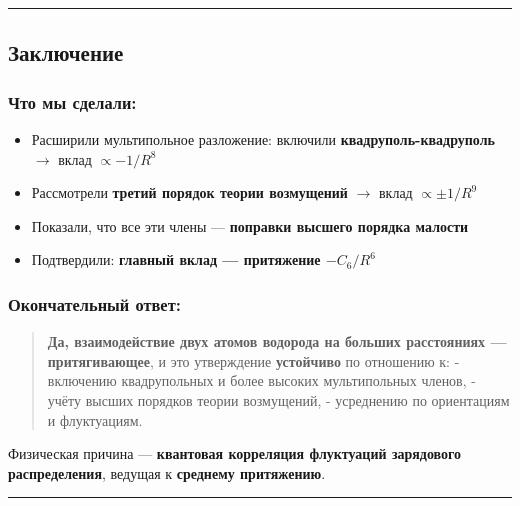 \documentclass[11pt]{article}
\providecommand{\tightlist}{%
      \setlength{\itemsep}{0pt}\setlength{\parskip}{0pt}}
\begin{document}
\begin{center}\rule{0.5\linewidth}{\linethickness}\end{center}

\subsection{Заключение}\label{ux437ux430ux43aux43bux44eux447ux435ux43dux438ux435-2}

\subsubsection{Что мы
сделали:}\label{ux447ux442ux43e-ux43cux44b-ux441ux434ux435ux43bux430ux43bux438}

\begin{itemize}
\tightlist
\item
  Расширили мультипольное разложение: включили
  \textbf{квадруполь-квадруполь} $\rightarrow$ вклад \(\propto -1/R^8\)
\item
  Рассмотрели \textbf{третий порядок теории возмущений} $\rightarrow$
  вклад \(\propto \pm 1/R^9\)
\item
  Показали, что все эти члены --- \textbf{поправки высшего порядка
  малости}
\item
  Подтвердили: \textbf{главный вклад --- притяжение \(-C_6 / R^6\)}
\end{itemize}

\subsubsection{Окончательный
ответ:}\label{ux43eux43aux43eux43dux447ux430ux442ux435ux43bux44cux43dux44bux439-ux43eux442ux432ux435ux442}

\begin{quote}
\textbf{Да, взаимодействие двух атомов водорода на больших расстояниях
--- притягивающее}, и это утверждение \textbf{устойчиво} по отношению к:
- включению квадрупольных и более высоких мультипольных членов, - учёту
высших порядков теории возмущений, - усреднению по ориентациям и
флуктуациям.
\end{quote}

Физическая причина --- \textbf{квантовая корреляция флуктуаций
зарядового распределения}, ведущая к \textbf{среднему притяжению}.

\begin{center}\rule{0.5\linewidth}{\linethickness}\end{center}
\end{document}
